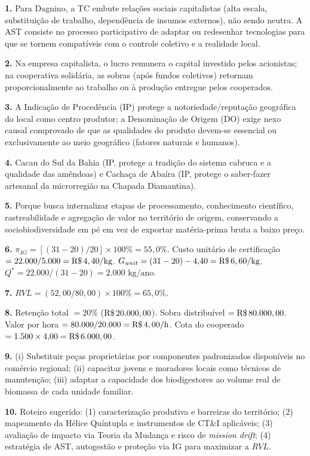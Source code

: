 \begin{boxGabarito}
\textbf{1.} Para Dagnino, a TC embute relações sociais capitalistas (alta escala, substituição de trabalho, dependência de insumos externos), não sendo neutra. A AST consiste no processo participativo de adaptar ou redesenhar tecnologias para que se tornem compatíveis com o controle coletivo e a realidade local.

\textbf{2.} Na empresa capitalista, o lucro remunera o capital investido pelos acionistas; na cooperativa solidária, as sobras (após fundos coletivos) retornam proporcionalmente ao trabalho ou à produção entregue pelos cooperados.

\textbf{3.} A Indicação de Procedência (IP) protege a notoriedade/reputação geográfica do local como centro produtor; a Denominação de Origem (DO) exige nexo causal comprovado de que as qualidades do produto devem-se essencial ou exclusivamente ao meio geográfico (fatores naturais e humanos).

\textbf{4.} Cacau do Sul da Bahia (IP, protege a tradição do sistema cabruca e a qualidade das amêndoas) e Cachaça de Abaíra (IP, protege o saber-fazer artesanal da microrregião na Chapada Diamantina).

\textbf{5.} Porque busca internalizar etapas de processamento, conhecimento científico, rastreabilidade e agregação de valor no território de origem, conservando a sociobiodiversidade em pé em vez de exportar matéria-prima bruta a baixo preço.

\textbf{6.} $\pi_{IG} = [(31 - 20)/20] \times 100\% = 55{,}0\%$. Custo unitário de certificação $= 22.000 / 5.000 = \text{R\$\,}{4,40}/\text{kg}$. $G_{unit} = (31 - 20) - 4{,}40 = \text{R\$\,}{6,60}/\text{kg}$. $Q^* = 22.000 / (31 - 20) = 2.000\text{ kg/ano}$.

\textbf{7.} $RVL = (52{,}00 / 80{,}00) \times 100\% = 65{,}0\%$.

\textbf{8.} Retenção total $= 20\%$ ($\text{R\$\,}{20.000,00}$). Sobra distribuível $= \text{R\$\,}{80.000,00}$. Valor por hora $= 80.000 / 20.000 = \text{R\$\,}{4,00}/\text{h}$. Cota do cooperado $= 1.500 \times 4{,}00 = \text{R\$\,}{6.000,00}$.

\textbf{9.} (i) Substituir peças proprietárias por componentes padronizados disponíveis no comércio regional; (ii) capacitar jovens e moradores locais como técnicos de manutenção; (iii) adaptar a capacidade dos biodigestores ao volume real de biomassa de cada unidade familiar.

\textbf{10.} Roteiro sugerido: (1) caracterização produtiva e barreiras do território; (2) mapeamento da Hélice Quíntupla e instrumentos de CT\&I aplicáveis; (3) avaliação de impacto via Teoria da Mudança e risco de \textit{mission drift}; (4) estratégia de AST, autogestão e proteção via IG para maximizar a $RVL$.


\end{boxGabarito}
